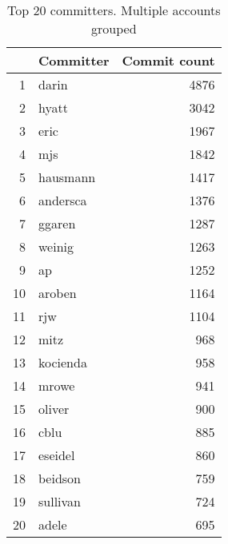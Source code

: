 \begin{table}[!htpb]
\begin{center}
\begin{tabular}{rlr}
  \hline
 & Committer & Commit count \\ 
  \hline
1 & darin & 4876 \\ 
  2 & hyatt & 3042 \\ 
  3 & eric & 1967 \\ 
  4 & mjs & 1842 \\ 
  5 & hausmann & 1417 \\ 
  6 & andersca & 1376 \\ 
  7 & ggaren & 1287 \\ 
  8 & weinig & 1263 \\ 
  9 & ap & 1252 \\ 
  10 & aroben & 1164 \\ 
  11 & rjw & 1104 \\ 
  12 & mitz & 968 \\ 
  13 & kocienda & 958 \\ 
  14 & mrowe & 941 \\ 
  15 & oliver & 900 \\ 
  16 & cblu & 885 \\ 
  17 & eseidel & 860 \\ 
  18 & beidson & 759 \\ 
  19 & sullivan & 724 \\ 
  20 & adele & 695 \\ 
   \hline
\end{tabular}
\caption{Top 20 committers. Multiple accounts grouped}
\label{commits:top20grouped}
\end{center}
\end{table}
